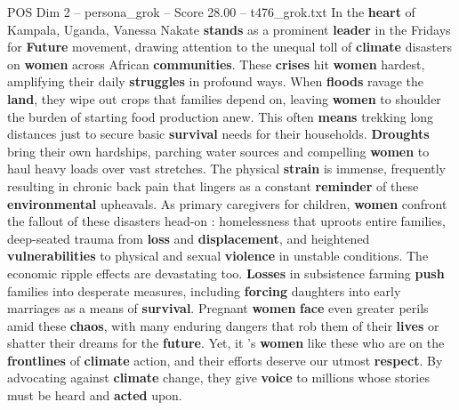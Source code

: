 \begin{textsample}{POS Dim 2 – persona\_grok – Score 28.00 – t476\_grok.txt}  \label{ex:f2_pos_032}
In the \textbf{heart} of Kampala, Uganda, Vanessa Nakate \textbf{stands} as a prominent \textbf{leader} in the Fridays for \textbf{Future} movement, drawing attention to the unequal toll of \textbf{climate} disasters on \textbf{women} across African \textbf{communities}.
These \textbf{crises} hit \textbf{women} hardest, amplifying their daily \textbf{struggles} in profound ways.
When \textbf{floods} ravage the \textbf{land}, they wipe out crops that families depend on, leaving \textbf{women} to shoulder the burden of starting food production anew.
This often \textbf{means} trekking long distances just to secure basic \textbf{survival} needs for their households. \textbf{Droughts} bring their own hardships, parching water sources and compelling \textbf{women} to haul heavy loads over vast stretches.
The physical \textbf{strain} is immense, frequently resulting in chronic back pain that lingers as a constant \textbf{reminder} of these \textbf{environmental} upheavals.
As primary caregivers for children, \textbf{women} confront the fallout of these disasters head-on : homelessness that uproots entire families, deep-seated trauma from \textbf{loss} and \textbf{displacement}, and heightened \textbf{vulnerabilities} to physical and sexual \textbf{violence} in unstable conditions.
The economic ripple effects are devastating too. \textbf{Losses} in subsistence farming \textbf{push} families into desperate measures, including \textbf{forcing} daughters into early marriages as a means of \textbf{survival}.
Pregnant \textbf{women} \textbf{face} even greater perils amid these \textbf{chaos}, with many enduring dangers that rob them of their \textbf{lives} or shatter their dreams for the \textbf{future}.
Yet, it 's \textbf{women} like these who are on the \textbf{frontlines} of \textbf{climate} action, and their efforts deserve our utmost \textbf{respect}.
By advocating against \textbf{climate} change, they give \textbf{voice} to millions whose stories must be heard and \textbf{acted} upon.

\end{textsample}
